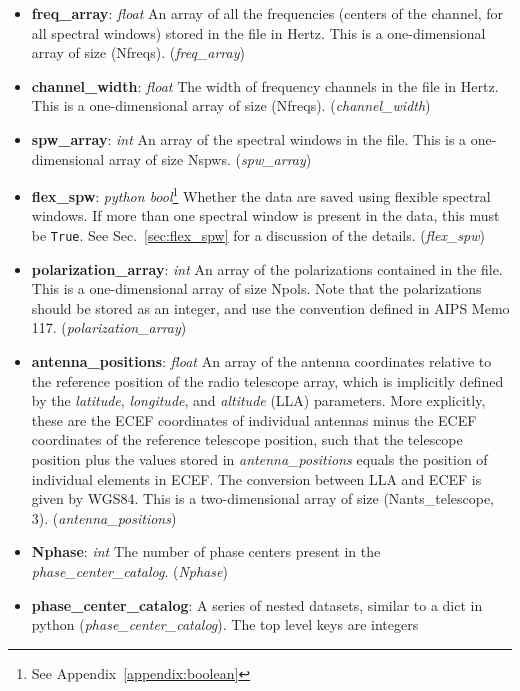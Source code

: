 \documentclass[11pt, oneside]{article}
\begin{document}
\begin{itemize}
  seconds of an integration. This is a one-dimensional array of size
  Nblts. (\textit{integration\_time})
\item \textbf{freq\_array}: \textit{float} An array of all the frequencies (centers
  of the channel, for all spectral windows) stored in the file in Hertz. This is a
  one-dimensional array of size (Nfreqs). (\textit{freq\_array})
\item \textbf{channel\_width}: \textit{float} The width of frequency channels in
  the file in Hertz. This is a one-dimensional array of size
  (Nfreqs). (\textit{channel\_width})
\item \textbf{spw\_array}: \textit{int} An array of the spectral windows in the
  file. This is a one-dimensional array of size Nspws. (\textit{spw\_array})
\item \textbf{flex\_spw}: \textit{python bool}\footnote{See Appendix~\ref{appendix:boolean}}
  Whether the data are saved using flexible spectral windows. If more than one
  spectral window is present in the data, this must be \texttt{True}. See
  Sec.~\ref{sec:flex_spw} for a discussion of the details. (\textit{flex\_spw})
\item \textbf{polarization\_array}: \textit{int} An array of the polarizations
  contained in the file. This is a one-dimensional array of size Npols. Note
  that the polarizations should be stored as an integer, and use the convention
  defined in AIPS Memo 117. (\textit{polarization\_array})
\item \textbf{antenna\_positions}: \textit{float} An array of the antenna
  coordinates relative to the reference position of the radio telescope array,
  which is implicitly defined by the \textit{latitude}, \textit{longitude}, and
  \textit{altitude} (LLA) parameters. More explicitly, these are the ECEF
  coordinates of individual antennas minus the ECEF coordinates of the reference
  telescope position, such that the telescope position plus the values stored in
  \textit{antenna\_positions} equals the position of individual elements in
  ECEF. The conversion between LLA and ECEF is given by WGS84. This is a
  two-dimensional array of size (Nants\_telescope,
  3). (\textit{antenna\_positions})
\item \textbf{Nphase}: \textit{int} The number of phase centers present in the
  \textit{phase\_center\_catalog}. (\textit{Nphase})
\item \textbf{phase\_center\_catalog}: A series of nested datasets, similar to
a dict in python (\textit{phase\_center\_catalog}). The top level keys are integers

\end{itemize}
\end{document}
